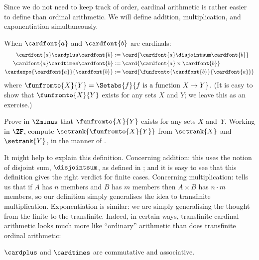 \documentclass[../../../include/open-logic-section]{subfiles}
\begin{document}

Since we do not need to keep track of order, cardinal arithmetic is
rather easier to define than ordinal arithmetic. We will define
addition, multiplication, and exponentiation simultaneously. 

\begin{defn}
When $\cardfont{a}$ and $\cardfont{b}$ are cardinals:
\begin{align*}
	\cardfont{a} \cardplus \cardfont{b} &:= 
	\card{\cardfont{a} \disjointsum \cardfont{b}}\\
	\cardfont{a} \cardtimes \cardfont{b} &:= 
	\card{\cardfont{a} \times \cardfont{b}}\\
	\cardexpo{\cardfont{a}}{\cardfont{b}} &:= 
	\card{\funfromto{\cardfont{b}}{\cardfont{a}}}
\end{align*}
where $\funfromto{X}{Y} = \Setabs{f}{f \text{ is a function } X \to Y}$.
(It is easy to show that $\funfromto{X}{Y}$ exists for any sets $X$
and $Y$; we leave this as an exercise.) 
\end{defn}

\begin{prob}
Prove in $\Zminus$ that $\funfromto{X}{Y}$ exists for any sets $X$
and~$Y$. Working in $\ZF$, compute $\setrank{\funfromto{X}{Y}}$ from
$\setrank{X}$ and $\setrank{Y}$, in the manner of
. 
\end{prob}

It might help to explain this definition. Concerning addition: this
uses the notion of disjoint sum, $\disjointsum$, as defined in
; and it is easy
to see that this definition gives the right verdict for finite cases.
Concerning multiplication:  tells us
that if $A$ has $n$ members and $B$ has $m$ members then $A \times B$
has $n \cdot m$ members, so our definition simply generalises the idea
to transfinite multiplication. Exponentiation is similar: we are
simply generalising the thought from the finite to the transfinite.
Indeed, in certain ways, transfinite cardinal arithmetic looks much
more like ``ordinary'' arithmetic than does transfinite ordinal
arithmetic:

\begin{prop}
$\cardplus$ and $\cardtimes$ are commutative and associative. 
\end{prop}
\end{document}
